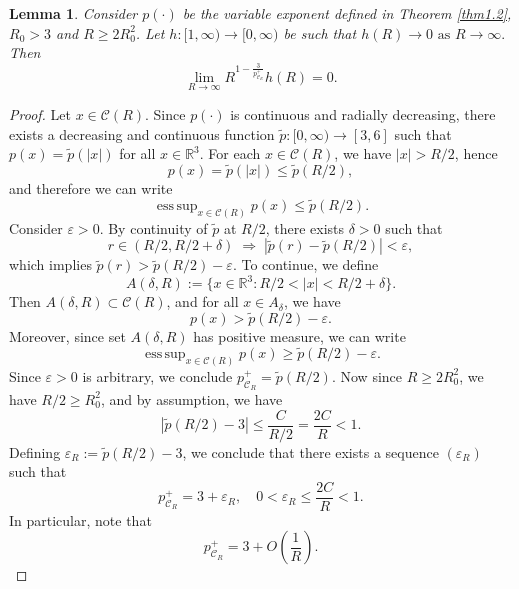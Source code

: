 \documentclass[a4paper,12pt]{amsart}
\theoremstyle{definition}
\theoremstyle{plain}
\newtheorem{lemma}{Lemma}[section]
\begin{document}
\begin{lemma}\label{prop:main_limit_thmover_new}
Consider $p(\cdot)$ be the variable exponent defined in Theorem \ref{thm1.2}, $R_0>3$ and $R\geq 2R_0^2$. Let  
$h:[1,\infty) \to [0,\infty)$ be such that 
$
h(R) \to 0  \text{ as } R \to \infty.
$ 
Then
\[
\lim_{R\to\infty} R^{1 - \frac{3}{p_{\mathcal{C}_R}^+}} h(R) = 0.
\]
\end{lemma}
\begin{proof} 
Let $x\in\mathcal{C}( R) $. 
Since $p(\cdot)$ is continuous and radially decreasing, there exists a decreasing and continuous function
$\tilde{p} : [0, \infty) \to [3, 6]$ such that $ p(x) = \tilde{p}(|x|) $ for all $ x \in \mathbb{R}^3 $.
For each $ x \in\mathcal{C}( R)  $, we have $|x| > R/2$, hence
\[
p(x) = \tilde{p}(|x|) \leq \tilde{p}(R/2),
\]
and therefore we can  write
\[
\operatorname{ess\,sup}_{x \in\mathcal{C}( R) } p(x) \leq \tilde{p}(R/2).
\]
Consider $\varepsilon > 0$. By continuity of $\tilde{p}$ at $R/2$, there exists $\delta > 0$ such that
\[
r \in (R/2, R/2 + \delta) \;\Rightarrow\; |\tilde{p}(r) - \tilde{p}(R/2)| < \varepsilon,
\]
which implies $\tilde{p}(r) > \tilde{p}(R/2) - \varepsilon$.
To continue, we define
\[
A(\delta,R) := \{x \in \mathbb{R}^3 : R/2 < |x| < R/2 + \delta\}.
\]
Then $A(\delta,R) \subset\mathcal{C}( R) $, and for all $x \in A_\delta$, we have
\[
p(x) > \tilde{p}(R/2) - \varepsilon.
\]
Moreover, since set $A(\delta,R)$ has positive measure,   we can write
\[
\operatorname{ess\,sup}_{x \in\mathcal{C}( R) } p(x) \geq \tilde{p}(R/2) - \varepsilon.
\]
Since $\varepsilon>0$ is arbitrary, we conclude
$
p_{\mathcal{C}_R}^+ = \tilde{p}(R/2).
$ 
Now since $R \geq 2R_0^2$, we have $R/2 \geq R_0^2$, and by assumption, we have 
\[
\left| \tilde p(R/2) - 3 \right| \leq \frac{C}{R/2} = \frac{2C}{R}<1.
\]
Defining $\varepsilon_R := \tilde p(R/2) - 3$, we conclude  
that there exists a sequence $(\varepsilon_R)$ such that
\[
p_{\mathcal{C}_R}^+ = 3 + \varepsilon_R, 
\quad 0<\varepsilon_R \le \frac{2C}{R}<1.
\]
In particular, note that 
\[
p_{\mathcal{C}_R}^+ = 3 + O\!\left( \frac{1}{R}\right).
\]


\end{proof}
\end{document}

